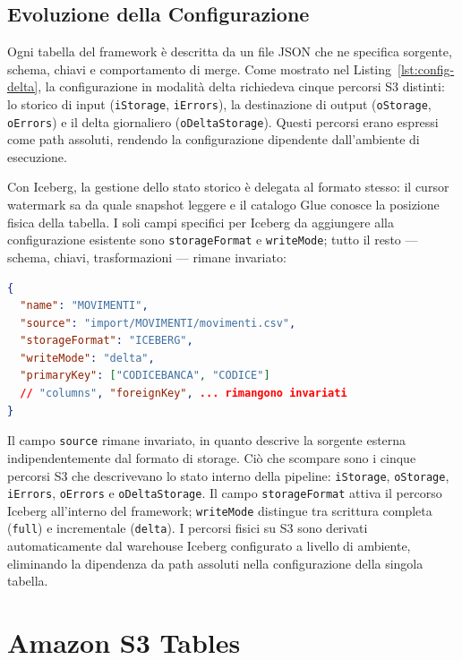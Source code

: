 \documentclass[12pt,a4paper,openright,twoside]{book}
\begin{document}
\newpage
\subsection{Evoluzione della Configurazione}
\label{sec:config-dichiarativa}

Ogni tabella del framework è descritta da un file JSON che ne specifica sorgente, schema, chiavi e comportamento di merge. Come mostrato nel Listing~\ref{lst:config-delta}, la configurazione in modalità delta richiedeva cinque percorsi S3 distinti: lo storico di input (\texttt{iStorage}, \texttt{iErrors}), la destinazione di output (\texttt{oStorage}, \texttt{oErrors}) e il delta giornaliero (\texttt{oDeltaStorage}). Questi percorsi erano espressi come path assoluti, rendendo la configurazione dipendente dall'ambiente di esecuzione.

Con Iceberg, la gestione dello stato storico è delegata al formato stesso: il cursor watermark sa da quale snapshot leggere e il catalogo Glue conosce la posizione fisica della tabella. I soli campi specifici per Iceberg da aggiungere alla configurazione esistente sono \texttt{storageFormat} e \texttt{writeMode}; tutto il resto — schema, chiavi, trasformazioni — rimane invariato:

\begin{lstlisting}[language=JSON, caption={Configurazione tabella in modalità Iceberg Delta}, label={lst:config-iceberg}]
{
  "name": "MOVIMENTI",
  "source": "import/MOVIMENTI/movimenti.csv",
  "storageFormat": "ICEBERG",
  "writeMode": "delta",
  "primaryKey": ["CODICEBANCA", "CODICE"]
  // "columns", "foreignKey", ... rimangono invariati
}
\end{lstlisting}

Il campo \texttt{source} rimane invariato, in quanto descrive la sorgente esterna indipendentemente dal formato di storage. 
Ciò che scompare sono i cinque percorsi S3 che descrivevano lo stato interno della pipeline: \texttt{iStorage}, \texttt{oStorage}, \texttt{iErrors}, \texttt{oErrors} e \texttt{oDeltaStorage}. 
Il campo \texttt{storageFormat} attiva il percorso Iceberg all'interno del framework; \texttt{writeMode} distingue tra scrittura completa (\texttt{full}) e incrementale (\texttt{delta}). 
I percorsi fisici su S3 sono derivati automaticamente dal warehouse Iceberg configurato a livello di ambiente, eliminando la dipendenza da path assoluti nella configurazione della singola tabella.

\newpage
\section{Amazon S3 Tables}
\label{sec:s3-tables}
\end{document}
